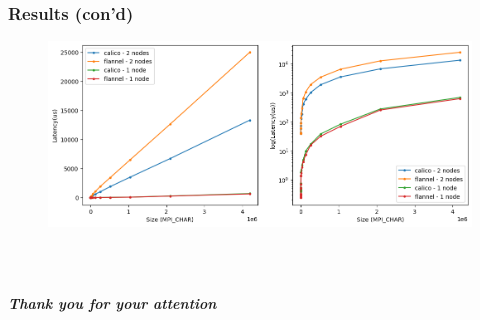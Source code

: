 \documentclass{beamer}
\begin{document}
\begin{frame}
    \frametitle{Results (con'd)}
    \begin{figure}
        \includegraphics[width=\textwidth]{images/other/calico_vs_flannel_plot}
    \end{figure}
\end{frame}



\begin{frame}
    \frametitle{\ }
    \begin{center}
        \Huge{\textbf{\textit{Thank you for your attention}}}
    \end{center}
\end{frame}
\end{document}
